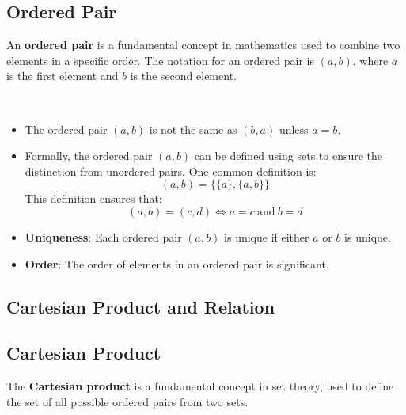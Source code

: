 \subsection*{Ordered Pair}

An \textbf{ordered pair} is a fundamental concept in mathematics used to combine two elements in a specific order. The notation for an ordered pair is \((a, b)\), where \(a\) is the first element and \(b\) is the second element.

\begin{remark}
	\ \begin{itemize}
		\item The ordered pair \((a, b)\) is not the same as \((b, a)\) unless \(a = b\).
		\item Formally, the ordered pair \((a, b)\) can be defined using sets to ensure the distinction from unordered pairs. One common definition is:
		\[
		(a, b) = \{ \{a\}, \{a, b\} \}
		\]
		This definition ensures that:
		\[
		(a, b) = (c, d) \iff a = c \ \text{and} \ b = d
		\]
	\end{itemize}
\end{remark}
\vspace{12pt}
\begin{note}[Properties]
\begin{itemize}
	\item \textbf{Uniqueness}: Each ordered pair \((a, b)\) is unique if either \(a\) or \(b\) is unique.
	\item \textbf{Order}: The order of elements in an ordered pair is significant.
\end{itemize}
\end{note}

\subsection{Cartesian Product and Relation}

\subsection*{Cartesian Product}

The \textbf{Cartesian product} is a fundamental concept in set theory, used to define the set of all possible ordered pairs from two sets.

